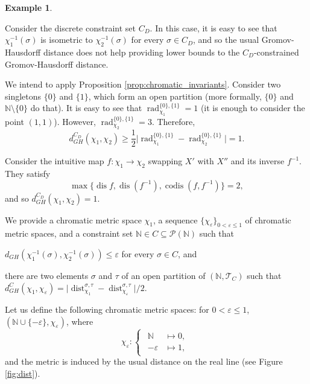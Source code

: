 \documentclass[8pt,a4paper,oneside,english,english]{article}
\theoremstyle{plain}
\theoremstyle
{plain}
\theoremstyle{definition}
\newtheorem{example}[theorem]{Example}%
\newcommand{\N}{\mathbb{N}}
\newcommand{\Tau}{\mathcal T}
\newcommand{\GH}{d_{GH}}
\DeclareMathOperator{\dist}{dist}
\DeclareMathOperator{\dis}{dis}
\DeclareMathOperator{\codis}{codis}
\DeclareMathOperator{\rad}{rad}
\begin{document}
\begin{example}
\begin{compactenum}[(i)]
    Consider the discrete constraint set $C_D$. In this case, it is easy to see that $\chi_1^{-1}(\sigma)$ is isometric to $\chi_2^{-1}(\sigma)$ for every $\sigma\in C_D$, and so the usual Gromov-Hausdorff distance does not help providing lower bounds to the $C_D$-constrained Gromov-Hausdorff distance. 
    
    We intend to apply Proposition \ref{prop:chromatic_invariants}. Consider two singletons $\{0\}$ and $\{1\}$, which form an open partition (more formally, $\{0\}$ and $\N\setminus\{0\}$ do that). It is easy to see that $\rad_{\chi_1}^{\{0\},\{1\}}=1$ (it is enough to consider the point $(1,1)$). However, $\rad_{\chi_2}^{\{0\},\{1\}}=3$. Therefore, 
    \[
    \GH^{C_D}(\chi_1,\chi_2)\geq\frac{1}{2}\lvert\rad_{\chi_1}^{\{0\},\{1\}}-\rad_{\chi_2}^{\{0\},\{1\}}\rvert= 1.
    \]

    Consider the intuitive map $f\colon \chi_1 \to \chi_2$ swapping $X'$ with $X''$ and its inverse $f^{-1}$. They satisfy 
    \[
    \max\{\dis f,\dis(f^{-1}),\codis(f,f^{-1})\}=2,
    \]
    and so $\GH^{C_D}(\chi_1,\chi_2)=1$.
\item We provide a chromatic metric space $\chi_1$, a sequence $\{\chi_\varepsilon\}_{0<\varepsilon\leq1}$ of chromatic metric spaces, and a constraint set $\N\in C\subseteq\mathcal P(\N)$ such that
\begin{compactenum}[(a)]
\item $\GH(\chi_1^{-1}(\sigma),\chi_2^{-1}(\sigma))\leq\varepsilon$ for every $\sigma\in C$, and
\item there are two elements $\sigma$ and $\tau$ of an open partition of $(\N,\Tau_C)$ such that $\GH^C(\chi_1,\chi_\varepsilon)=\lvert\dist^{\sigma,\tau}_{\chi_1}-\dist^{\sigma,\tau}_{\chi_\varepsilon}\rvert/2$.
\end{compactenum}
Let us define the following chromatic metric spaces: for $0<\varepsilon\leq 1$, $(\N\cup\{-\varepsilon\},\chi_\varepsilon)$, where 
\[
\chi_\varepsilon\colon\begin{cases}
    \begin{aligned}
        \N &\mapsto 0,\\
        -\varepsilon&\mapsto 1,
    \end{aligned}
\end{cases}
\]
and the metric is induced by the usual distance on the real line (see Figure \ref{fig:dist}).
\begin{figure}[h!]
    \centering
\end{figure}
\end{compactenum}
\end{example}
\end{document}
